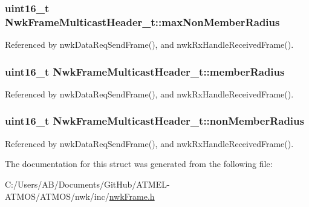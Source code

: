 \hypertarget{struct_nwk_frame_multicast_header__t_ad93a788fcf5ef8690deb6681406ddde7}{
\subsubsection[{max\-Non\-Member\-Radius}]{\setlength{\rightskip}{0pt plus 5cm}uint16\-\_\-t Nwk\-Frame\-Multicast\-Header\-\_\-t\-::max\-Non\-Member\-Radius}}\label{struct_nwk_frame_multicast_header__t_ad93a788fcf5ef8690deb6681406ddde7}


Referenced by nwk\-Data\-Req\-Send\-Frame(), and nwk\-Rx\-Handle\-Received\-Frame().

\hypertarget{struct_nwk_frame_multicast_header__t_abfc3e12c48cebacbe72f2db5f812fd71}{
\subsubsection[{member\-Radius}]{\setlength{\rightskip}{0pt plus 5cm}uint16\-\_\-t Nwk\-Frame\-Multicast\-Header\-\_\-t\-::member\-Radius}}\label{struct_nwk_frame_multicast_header__t_abfc3e12c48cebacbe72f2db5f812fd71}


Referenced by nwk\-Data\-Req\-Send\-Frame(), and nwk\-Rx\-Handle\-Received\-Frame().

\hypertarget{struct_nwk_frame_multicast_header__t_ae345f9729f9f70acb56384c58b74d7fe}{
\subsubsection[{non\-Member\-Radius}]{\setlength{\rightskip}{0pt plus 5cm}uint16\-\_\-t Nwk\-Frame\-Multicast\-Header\-\_\-t\-::non\-Member\-Radius}}\label{struct_nwk_frame_multicast_header__t_ae345f9729f9f70acb56384c58b74d7fe}


Referenced by nwk\-Data\-Req\-Send\-Frame(), and nwk\-Rx\-Handle\-Received\-Frame().



The documentation for this struct was generated from the following file\-:\begin{DoxyCompactItemize}
\item 
C\-:/\-Users/\-A\-B/\-Documents/\-Git\-Hub/\-A\-T\-M\-E\-L-\/\-A\-T\-M\-O\-S/\-A\-T\-M\-O\-S/nwk/inc/\hyperlink{nwk_frame_8h}{nwk\-Frame.\-h}\end{DoxyCompactItemize}
